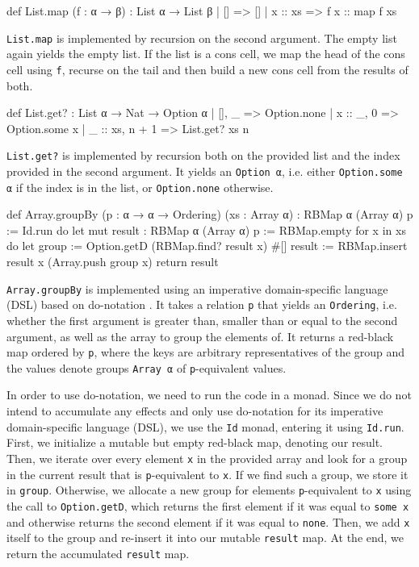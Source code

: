 \begin{code}
def List.map (f : α → β) : List α → List β
  | []      => []
  | x :: xs => f x :: map f xs
\end{code}
\lstinline|List.map| is implemented by recursion on the second argument. The empty list again yields the empty list. If the list is a cons cell, we map the head of the cons cell using \lstinline|f|, recurse on the tail and then build a new cons cell from the results of both.

\begin{code}
def List.get? : List α → Nat → Option α
  | [],      _     => Option.none
  | x :: _,  0     => Option.some x
  | _ :: xs, n + 1 => List.get? xs n
\end{code}
\lstinline|List.get?| is implemented by recursion both on the provided list and the index provided in the second argument. It yields an \lstinline|Option α|, i.e. either \lstinline|Option.some α| if the index is in the list, or \lstinline|Option.none| otherwise.

\begin{code}
def Array.groupBy (p : α → α → Ordering) (xs : Array α)
  : RBMap α (Array α) p := Id.run do
  let mut result : RBMap α (Array α) p := RBMap.empty
  for x in xs do
    let group := Option.getD (RBMap.find? result x) #[]
    result := RBMap.insert result x (Array.push group x)
  return result
\end{code}
\lstinline|Array.groupBy| is implemented using an imperative domain-specific language (DSL) based on do-notation \citep{ullrich_beyond_2022}. It takes a relation \lstinline|p| that yields an \lstinline|Ordering|, i.e. whether the first argument is greater than, smaller than or equal to the second argument, as well as the array to group the elements of. It returns a red-black map ordered by \lstinline|p|, where the keys are arbitrary representatives of the group and the values denote groups \lstinline|Array α| of \lstinline|p|-equivalent values.

In order to use do-notation, we need to run the code in a monad. Since we do not intend to accumulate any effects and only use do-notation for its imperative domain-specific language (DSL), we use the \lstinline|Id| monad, entering it using \lstinline|Id.run|. First, we initialize a mutable but empty red-black map, denoting our result. Then, we iterate over every element \lstinline|x| in the provided array and look for a group in the current result that is \lstinline|p|-equivalent to \lstinline|x|. If we find such a group, we store it in \lstinline|group|. Otherwise, we allocate a new group for elements \lstinline|p|-equivalent to \lstinline|x| using the call to \lstinline|Option.getD|, which returns the first element if it was equal to \lstinline|some x| and otherwise returns the second element if it was equal to \lstinline|none|. Then, we add \lstinline|x| itself to the group and re-insert it into our mutable \lstinline|result| map. At the end, we return the accumulated \lstinline|result| map.

